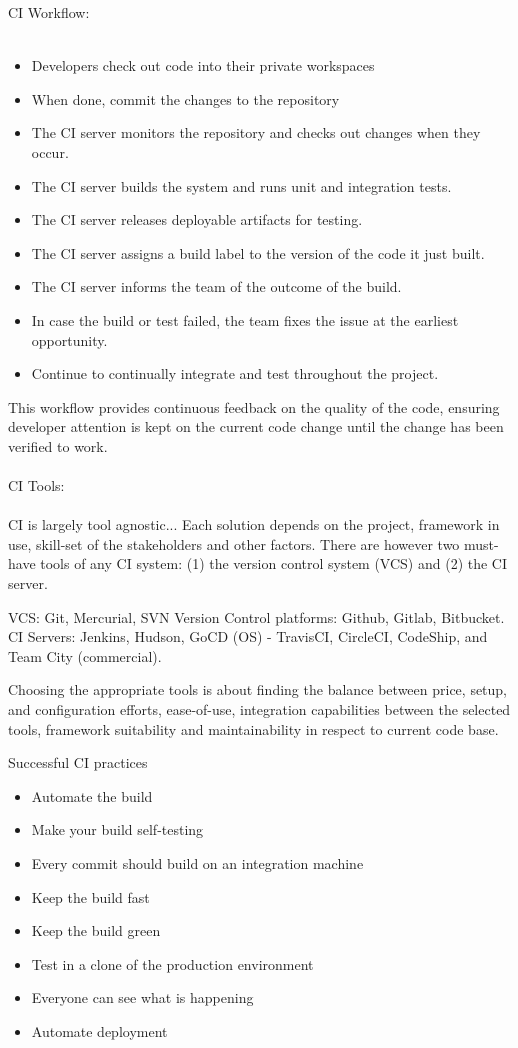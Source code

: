 CI Workflow:\\
\\
\begin{itemize}
\item Developers check out code into their private workspaces
\item When done, commit the changes to the repository
\item The CI server monitors the repository and checks out changes when they occur.
\item The CI server builds the system and runs unit and integration tests.
\item The CI server releases deployable artifacts for testing.
\item The CI server assigns a build label to the version of the code it just built.
\item The CI server informs the team of the outcome of the build.
\item In case the build or test failed, the team fixes the issue at the earliest opportunity.
\item Continue to continually integrate and test throughout the project.
\end{itemize}

This workflow provides continuous feedback on the quality of the code, ensuring developer attention is kept on the current code change until the change has been verified to work.\\
\\
CI Tools:\\
\\
CI is largely tool agnostic... Each solution depends on the project, framework in use, skill-set of the stakeholders and other factors. There are however two must-have tools of any CI system: (1) the version control system (VCS) and (2) the CI server.

VCS: Git, Mercurial, SVN 
Version Control platforms: Github, Gitlab, Bitbucket.
CI Servers: Jenkins, Hudson, GoCD (OS) - TravisCI, CircleCI, CodeShip, and Team City (commercial).

Choosing the appropriate tools is about finding the balance between price, setup, and configuration efforts, ease-of-use, integration capabilities between the selected tools, framework suitability and maintainability in respect to current code base.

Successful CI practices\\
\begin{itemize}
\item Automate the build
\item Make your build self-testing
\item Every commit should build on an integration machine
\item Keep the build fast
\item Keep the build green
\item Test in a clone of the production environment
\item Everyone can see what is happening
\item Automate deployment
\end{itemize}

